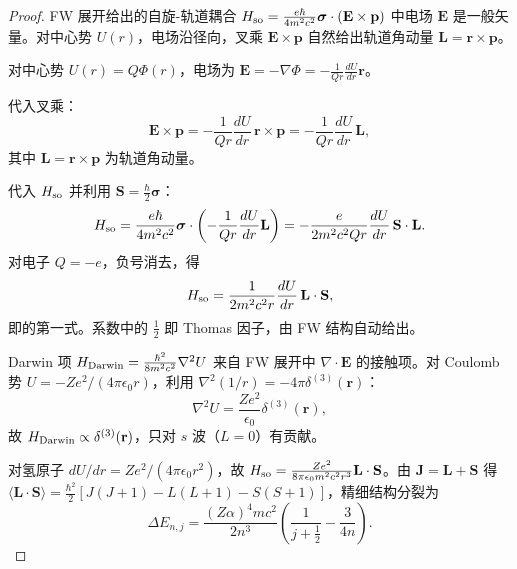 \begin{proof}
FW 展开给出的自旋-轨道耦合 \(H_{\rm so}=\frac{e\hbar}{4m^2c^2}\boldsymbol\sigma\cdot(\mathbf E\times\mathbf p)\) 中电场 \(\mathbf E\) 是一般矢量。对中心势 \(U(r)\)，电场沿径向，叉乘 \(\mathbf E\times\mathbf p\) 自然给出轨道角动量 \(\mathbf L=\mathbf r\times\mathbf p\)。

对中心势 \(U(r)=Q\Phi(r)\)，电场为 \(\mathbf E=-\nabla\Phi=-\frac{1}{Qr}\frac{dU}{dr}\mathbf r\)。

代入叉乘：
\begin{equation*}
\mathbf E\times\mathbf p=-\frac{1}{Qr}\frac{dU}{dr}\,\mathbf r\times\mathbf p=-\frac{1}{Qr}\frac{dU}{dr}\,\mathbf L,
\end{equation*}
其中 \(\mathbf L=\mathbf r\times\mathbf p\) 为轨道角动量。

代入 \(H_{\rm so}\) 并利用 \(\mathbf S=\frac{\hbar}{2}\boldsymbol\sigma\)：
\begin{equation*}
H_{\rm so}=\frac{e\hbar}{4m^2c^2}\boldsymbol\sigma\cdot\left(-\frac{1}{Qr}\frac{dU}{dr}\mathbf L\right)
=-\frac{e}{2m^2c^2Qr}\frac{dU}{dr}\,\mathbf S\cdot\mathbf L.
\end{equation*}
对电子 \(Q=-e\)，负号消去，得
\begin{equation*}
H_{\rm so}=\frac{1}{2m^2c^2r}\frac{dU}{dr}\,\mathbf L\cdot\mathbf S,
\end{equation*}
即的第一式。系数中的 \(\frac{1}{2}\) 即 Thomas 因子，由 FW 结构自动给出。

Darwin 项 \(H_{\rm Darwin}=\frac{\hbar^2}{8m^2c^2}\nabla^2 U\) 来自 FW 展开中 \(\nabla\cdot\mathbf E\) 的接触项。对 Coulomb 势 \(U=-Ze^2/(4\pi\epsilon_0 r)\)，利用 \(\nabla^2(1/r)=-4\pi\delta^{(3)}(\mathbf r)\)：
\begin{equation*}
\nabla^2 U=\frac{Ze^2}{\epsilon_0}\delta^{(3)}(\mathbf r),
\end{equation*}
故 \(H_{\rm Darwin}\propto\delta^{(3)}(\mathbf r)\)，只对 \(s\) 波（\(L=0\)）有贡献。

对氢原子 \(dU/dr=Ze^2/(4\pi\epsilon_0 r^2)\)，故 \(H_{\rm so}=\frac{Ze^2}{8\pi\epsilon_0 m^2c^2 r^3}\mathbf L\cdot\mathbf S\)。由 \(\mathbf J=\mathbf L+\mathbf S\) 得 \(\langle\mathbf L\cdot\mathbf S\rangle=\frac{\hbar^2}{2}[J(J+1)-L(L+1)-S(S+1)]\)，精细结构分裂为
\begin{equation*}
 \Delta E_{n,j}=\frac{(Z\alpha)^4 mc^2}{2n^3}\left(\frac{1}{j+\frac12}-\frac{3}{4n}\right).
\end{equation*}

\end{proof}

